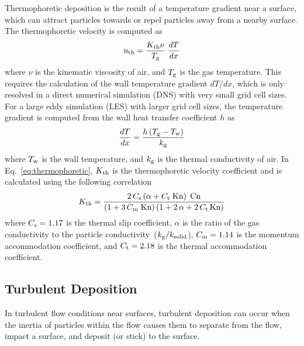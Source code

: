 Thermophoretic deposition is the result of a temperature gradient near a surface, which can attract particles towards or repel particles away from a nearby surface. The thermophoretic velocity is computed as
\begin{equation}
u\sb{th} = \frac{K\sb{th} \nu}{T\sb{g}} \; \frac{dT}{dx}
\label{eq:thermophoretic}
\end{equation}
where $\nu$ is the kinematic viscosity of air, and $T\sb{g}$ is the gas temperature. This requires the calculation of the wall temperature gradient $dT/dx$, which is only resolved in a direct numerical simulation (DNS) with very small grid cell sizes. For a large eddy simulation (LES) with larger grid cell sizes, the temperature gradient is computed from the wall heat transfer coefficient $h$ as
\begin{equation}
 \frac{dT}{dx} = \frac{h \left( T\sb{g} - T\sb{w} \right)}{k\sb{g}}
\end{equation}
where $T\sb{w}$ is the wall temperature, and $k\sb{g}$ is the thermal conductivity of air. In Eq.~\ref{eq:thermophoretic}, $K\sb{th}$ is the thermophoretic velocity coefficient and is calculated using the following correlation~\cite{Brock:1}
\begin{equation}
 K\sb{th} = \frac{2 \, C\sb{s} \left(\alpha + C\sb{t} \; \textrm{Kn} \right) \; \textrm{Cn}}{\left(1 + 3 \, C\sb{m} \; \textrm{Kn} \right) \left(1 + 2 \, \alpha + 2 \, C\sb{t} \, \textrm{Kn} \right) }
\end{equation}
where $C\sb{s}=1.17$ is the thermal slip coefficient, $\alpha$ is the ratio of the gas conductivity to the particle conductivity~($k\sb{g}/k\sb{solid}$), $C\sb{m}=1.14$ is the momentum accommodation coefficient, and $C\sb{t}=2.18$ is the thermal accommodation coefficient.

\subsection{Turbulent Deposition}
\label{sec:turbulent_deposition}

In turbulent flow conditions near surfaces, turbulent deposition can occur when the inertia of particles within the flow causes them to separate from the flow, impact a surface, and deposit (or stick) to the surface.

